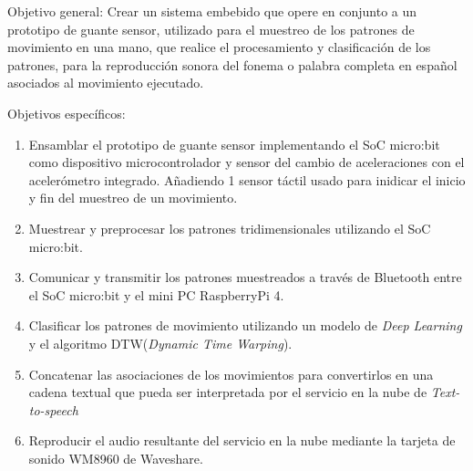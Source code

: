 \hfill\break 
Objetivo general: \hfill\break
Crear un sistema embebido que opere en conjunto a un prototipo de guante sensor, utilizado para el muestreo de los patrones de movimiento en una mano, que realice el procesamiento y clasificación de los patrones, para la reproducción sonora del fonema o palabra completa en español asociados al movimiento ejecutado.

\hfill\break
Objetivos específicos:	
\begin{enumerate}
	
	\item \justifying Ensamblar el prototipo de guante sensor implementando el SoC micro:bit como dispositivo microcontrolador y sensor del cambio de aceleraciones con el acelerómetro integrado. Añadiendo 1 sensor táctil usado para inidicar el inicio y fin del muestreo de un movimiento.

	\item \justifying Muestrear y preprocesar los patrones tridimensionales utilizando el SoC micro:bit.
	
	\item \justifying Comunicar y transmitir los patrones muestreados a través de Bluetooth entre el SoC micro:bit y el mini PC RaspberryPi 4.
	
	\item \justifying Clasificar los patrones de movimiento utilizando un modelo de \textit{Deep Learning} y el algoritmo DTW(\textit{Dynamic Time Warping}).
	
	\item \justifying Concatenar las asociaciones de los movimientos para convertirlos en una cadena textual que pueda ser interpretada por el servicio en la nube de \textit{Text-to-speech}
	
	\item \justifying Reproducir el audio resultante del servicio en la nube mediante la tarjeta de sonido WM8960 de Waveshare.
\end{enumerate}